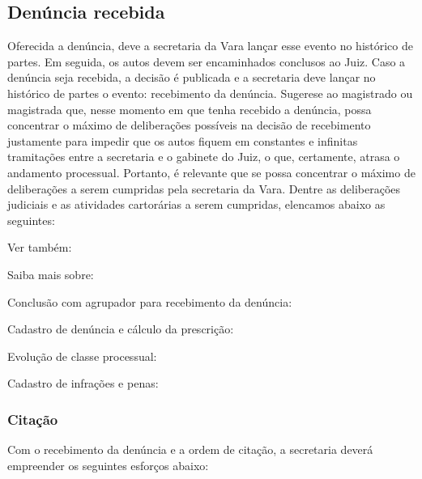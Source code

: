 \documentclass[letterpaper,10pt,brazil]{sphinxmanual}
\begin{document}
\subsection{Denúncia recebida}
\label{\detokenize{02analisedenuncia:denuncia-recebida}}
\sphinxAtStartPar
Oferecida a denúncia, deve a secretaria da Vara lançar esse evento no histórico de partes.
Em seguida, os autos devem ser encaminhados conclusos ao Juiz.
Caso a denúncia seja recebida, a decisão é publicada e a secretaria deve lançar no histórico de partes o evento: recebimento da denúncia.
Sugere\sphinxhyphen{}se ao magistrado ou magistrada que, nesse momento em que tenha recebido a denúncia, possa concentrar o máximo de deliberações possíveis na decisão de recebimento justamente para impedir que os autos fiquem em constantes e infinitas tramitações entre a secretaria e o gabinete do Juiz, o que, certamente, atrasa o andamento processual.
Portanto, é relevante que se possa concentrar o máximo de deliberações a serem cumpridas pela secretaria da Vara.
Dentre as deliberações judiciais e as atividades cartorárias a serem cumpridas, elencamos abaixo as seguintes:


\begin{sphinxseealso}{Ver também:}

\sphinxAtStartPar
Saiba mais sobre:

\sphinxAtStartPar
Conclusão com agrupador para recebimento da denúncia: {\hyperref[\detokenize{projud_51_agrupador::doc}]{}}

\sphinxAtStartPar
Cadastro de denúncia e cálculo da prescrição: {\hyperref[\detokenize{projud_53_cadastrodenuncia::doc}]{}}

\sphinxAtStartPar
Evolução de classe processual: {\hyperref[\detokenize{projud_19_evolucao_retificacao::doc}]{}}

\sphinxAtStartPar
Cadastro de infrações e penas: {\hyperref[\detokenize{projud_52_cadastroinfracoes::doc}]{}}


\end{sphinxseealso}



\subsubsection{Citação}
\label{\detokenize{02analisedenuncia:citacao}}
\sphinxAtStartPar
Com o recebimento da denúncia e a ordem de citação, a secretaria deverá empreender os seguintes esforços abaixo:
\end{document}

